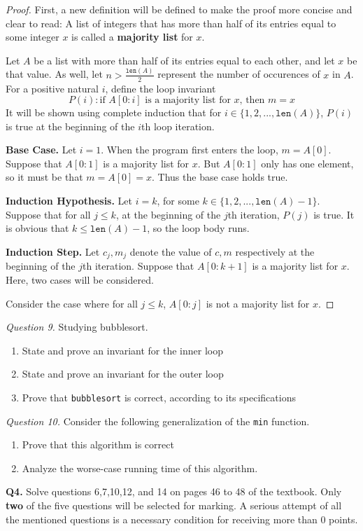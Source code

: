 \documentclass[11pt]{article}
\begin{document}
    \begin{proof}
        First, a new definition will be defined to make the proof more concise and clear to read: A list of integers that has more than half of its entries equal to some integer \(x\) is called a \textbf{majority list} for \(x\).

        Let \(A\) be a list with more than half of its entries equal to each other, and let \(x\) be that value. As well, let \(n > \frac{\texttt{len}(A)}{2}\) represent the number of occurences of \(x\) in \(A\). For a positive natural \(i\), define the loop invariant
        \[
            P(i) : \text{if } A[0:i] \text{ is a majority list for } x \text{, then } m=x
        \]
        It will be shown using complete induction that for \(i \in \{1,2,...,\texttt{len}(A)\}\), \(P(i)\) is true at the beginning of the \(i\)th loop iteration.

        \textbf{Base Case.} Let \(i=1\). When the program first enters the loop, \(m=A[0]\). Suppose that \(A[0:1]\) is a majority list for \(x\). But \(A[0:1]\) only has one element, so it must be that \(m=A[0]=x\). Thus the base case holds true.

        \textbf{Induction Hypothesis.} Let \(i=k\), for some \(k \in \{1, 2,..., \texttt{len}(A) - 1\}\). Suppose that for all \(j \leq k\),  at the beginning of the \(j\)th iteration, \(P(j)\) is true. It is obvious that \(k \leq \texttt{len}(A) - 1\), so the loop body runs.

        \textbf{Induction Step.} Let \(c_j,m_j\) denote the value of \(c,m\) respectively at the beginning of the \(j\)th iteration. Suppose that \(A[0:k+1]\) is a majority list for \(x\). Here, two cases will be considered.

        Consider the case where for all \(j\leq k\), \(A[0:j]\) is not a majority list for \(x\).
    \end{proof}
    \textit{Question 9.} Studying bubblesort.
    \begin{enumerate}[label=(\alph*)]
        \item State and prove an invariant for the inner loop
        \item State and prove an invariant for the outer loop
        \item Prove that \verb|bubblesort| is correct, according to its specifications
    \end{enumerate}
    \textit{Question 10.} Consider the following generalization of the \verb|min| function.
    \begin{enumerate}[label=(\alph*)]
        \item Prove that this algorithm is correct
        \item Analyze the worse-case running time of this algorithm.
    \end{enumerate}
    \pagebreak
    \textbf{Q4.} Solve questions 6,7,10,12, and 14 on pages 46 to 48 of the textbook. Only \textbf{two} of the five questions will be selected for marking. A serious attempt of all the mentioned questions is a necessary condition for receiving more than 0 points.
\end{document}
